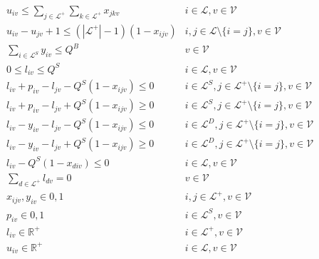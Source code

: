 \begin{eqnarray}
	    & u_{iv} \leq \displaystyle\sum_{j \in \mathcal{L}^{+}} \displaystyle\sum_{k \in \mathcal{L}^{+}} x_{jkv} &  i\in \mathcal{L}, v\in \mathcal{V} \label{eq:const_subtour1_A}\\
	    & u_{iv} - u_{jv} +1 \leq (|\mathcal{L}^{+}|-1)(1-x_{ijv})&   i,j \in \mathcal{L} \setminus\{i=j\}, v\in \mathcal{V} \label{eq:const_subtour2_A}\\
	    & \displaystyle\sum_{i\in \mathcal{L}^{S}}y_{iv} \leq Q^{B} &   v \in \mathcal{V} \label{eq:capacity_const_A}\\
	    & 0 \leq l_{iv} \leq Q^{S} & i \in \mathcal{L}, v \in \mathcal{V} \label{eq:const_vcap_A}\\
	    & l_{iv} + p_{iv} - l_{jv} - Q^{S}(1-x_{ijv}) \leq 0 & i \in \mathcal{L}^{S}, j \in \mathcal{L}^{+} \setminus\{i=j\}, v \in \mathcal{V} \label{eq:const_vcap_pickup_A}\\
	    & l_{iv} + p_{iv} - l_{jv} + Q^{S}(1-x_{ijv}) \geq 0 & i \in \mathcal{L}^{S}, j \in \mathcal{L}^{+} \setminus\{i=j\}, v \in \mathcal{V} \label{eq:const_vcap_pickup_A}\\
	    & l_{iv} - y_{iv} - l_{jv} - Q^{S}(1-x_{ijv}) \leq 0 & i \in \mathcal{L}^{D}, j \in \mathcal{L}^{+} \setminus\{i=j\}, v \in \mathcal{V} \label{eq:const_vcap_delivery_A}\\
	    & l_{iv} - y_{iv} - l_{jv} + Q^{S}(1-x_{ijv}) \geq 0 & i \in \mathcal{L}^{D}, j \in \mathcal{L}^{+} \setminus\{i=j\}, v \in \mathcal{V} \label{eq:const_vcap_delivery_A}\\
	    & l_{iv} - Q^{S}(1-x_{div}) \leq 0 & i \in \mathcal{L}, v \in \mathcal{V} \label{eq:const_vcap_depot_out_A}\\
	    & \displaystyle\sum_{d\in \mathcal{L}^+}l_{dv} = 0 & v \in \mathcal{V} \label{eq:const_vcap_depot_in_A}\\
	    & x_{ijv}, y_{iv} \in {0, 1} &   i,j\in \mathcal{L}^{+}, v\in \mathcal{V} \\
	    & p_{iv} \in {0, 1} &   i\in \mathcal{L}^{S}, v\in \mathcal{V} \\
	    & l_{iv} \in \mathbb{R}^{+} & i\in \mathcal{L}^{+}, v\in \mathcal{V} \\
	    & u_{iv} \in \mathbb{R}^{+} & i\in \mathcal{L}, v\in \mathcal{V} 
\end{eqnarray}
